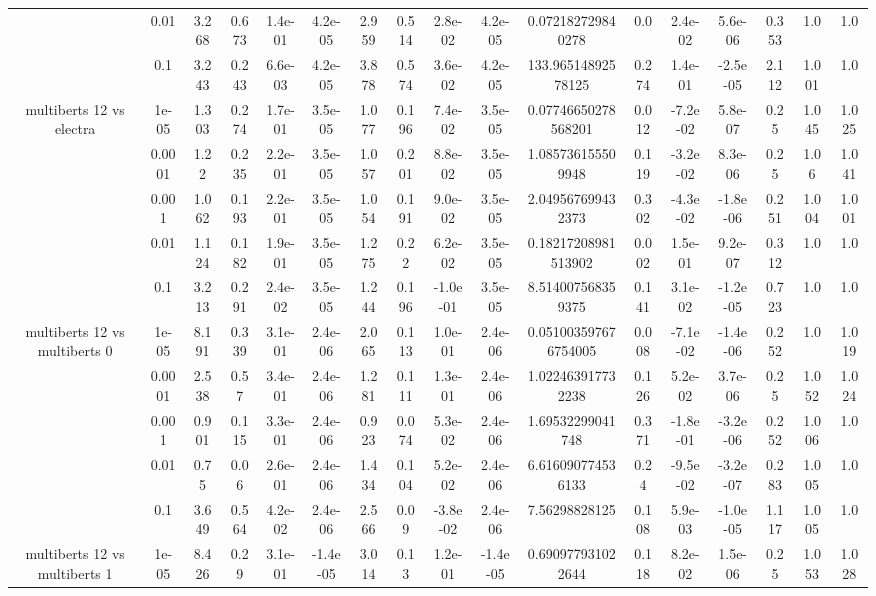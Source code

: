 \begin{tabular}{|c|c|c|c|c|c|c|c|c|c|c|c|c|c|c|c|c|}
 & 0.01 & 3.268 & 0.673 & 1.4e-01 & 4.2e-05 & 2.959 & 0.514 & 2.8e-02 & 4.2e-05 & 0.072182729840278 & 0.0 & 2.4e-02 & 5.6e-06 & 0.353 & 1.0 & 1.0 \\
 & 0.1 & 3.243 & 0.243 & 6.6e-03 & 4.2e-05 & 3.878 & 0.574 & 3.6e-02 & 4.2e-05 & 133.96514892578125 & 0.274 & 1.4e-01 & -2.5e-05 & 2.112 & 1.001 & 1.0 \\
\hline
\multirow{5}{*}{multiberts 12 vs electra } & 1e-05 & 1.303 & 0.274 & 1.7e-01 & 3.5e-05 & 1.077 & 0.196 & 7.4e-02 & 3.5e-05 & 0.07746650278568201 & 0.012 & -7.2e-02 & 5.8e-07 & 0.25 & 1.045 & 1.025 \\
 & 0.0001 & 1.22 & 0.235 & 2.2e-01 & 3.5e-05 & 1.057 & 0.201 & 8.8e-02 & 3.5e-05 & 1.085736155509948 & 0.119 & -3.2e-02 & 8.3e-06 & 0.25 & 1.06 & 1.041 \\
 & 0.001 & 1.062 & 0.193 & 2.2e-01 & 3.5e-05 & 1.054 & 0.191 & 9.0e-02 & 3.5e-05 & 2.049567699432373 & 0.302 & -4.3e-02 & -1.8e-06 & 0.251 & 1.004 & 1.001 \\
 & 0.01 & 1.124 & 0.182 & 1.9e-01 & 3.5e-05 & 1.275 & 0.22 & 6.2e-02 & 3.5e-05 & 0.18217208981513902 & 0.002 & 1.5e-01 & 9.2e-07 & 0.312 & 1.0 & 1.0 \\
 & 0.1 & 3.213 & 0.291 & 2.4e-02 & 3.5e-05 & 1.244 & 0.196 & -1.0e-01 & 3.5e-05 & 8.514007568359375 & 0.141 & 3.1e-02 & -1.2e-05 & 0.723 & 1.0 & 1.0 \\
\hline
\multirow{5}{*}{multiberts 12 vs multiberts 0} & 1e-05 & 8.191 & 0.339 & 3.1e-01 & 2.4e-06 & 2.065 & 0.113 & 1.0e-01 & 2.4e-06 & 0.051003597676754005 & 0.008 & -7.1e-02 & -1.4e-06 & 0.252 & 1.0 & 1.019 \\
 & 0.0001 & 2.538 & 0.57 & 3.4e-01 & 2.4e-06 & 1.281 & 0.111 & 1.3e-01 & 2.4e-06 & 1.022463917732238 & 0.126 & 5.2e-02 & 3.7e-06 & 0.25 & 1.052 & 1.024 \\
 & 0.001 & 0.901 & 0.115 & 3.3e-01 & 2.4e-06 & 0.923 & 0.074 & 5.3e-02 & 2.4e-06 & 1.69532299041748 & 0.371 & -1.8e-01 & -3.2e-06 & 0.252 & 1.006 & 1.0 \\
 & 0.01 & 0.75 & 0.06 & 2.6e-01 & 2.4e-06 & 1.434 & 0.104 & 5.2e-02 & 2.4e-06 & 6.616090774536133 & 0.24 & -9.5e-02 & -3.2e-07 & 0.283 & 1.005 & 1.0 \\
 & 0.1 & 3.649 & 0.564 & 4.2e-02 & 2.4e-06 & 2.566 & 0.09 & -3.8e-02 & 2.4e-06 & 7.56298828125 & 0.108 & 5.9e-03 & -1.0e-05 & 1.117 & 1.005 & 1.0 \\
\hline
\multirow{5}{*}{multiberts 12 vs multiberts 1} & 1e-05 & 8.426 & 0.29 & 3.1e-01 & -1.4e-05 & 3.014 & 0.13 & 1.2e-01 & -1.4e-05 & 0.690977931022644 & 0.118 & 8.2e-02 & 1.5e-06 & 0.25 & 1.053 & 1.028 \\

\end{tabular}
